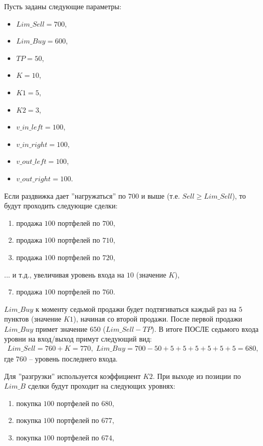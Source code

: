 
Пусть заданы следующие параметры:

\begin{itemize}
\item$Lim\_Sell= 700$,
\item$Lim\_Buy = 600$,
\item$TP = 50$,
\item$K  = 10$,
\item$K1 = 5$,
\item$K2 = 3$,
\item$v\_in\_left  = 100$,
\item$v\_in\_right  = 100$,
\item$v\_out\_left = 100$,
\item$v\_out\_right = 100$.
\end{itemize}

Если раздвижка дает ''нагружаться'' по $700$ и выше (т.е. $Sell \geq Lim\_Sell$), то будут проходить следующие сделки:
\begin{enumerate}
\item продажа $100$ портфелей по $700$,
\item продажа $100$ портфелей по $710$,
\item продажа $100$ портфелей по $720$,
\end{enumerate}

... и т.д., увеличивая уровень входа на $10$ (значение $K$),

\begin{enumerate}
\setcounter{enumi}{6}
\item продажа $100$ портфелей по $760$.
\end{enumerate}

\noindent $Lim\_Buy$ к моменту седьмой продажи будет подтягиваться каждый раз на $5$ пунктов (значение  $K1$), начиная  со второй продажи. После первой продажи $Lim\_Buy$
примет значение $650$ ($Lim\_Sell - TP$). В итоге ПОСЛЕ седьмого входа уровни на вход/выход примут следующий вид:
\begin{align*}
Lim\_Sell = 760 + K = 770, \;
Lim\_Buy = 700 - 50 + 5 + 5 + 5 + 5 + 5 + 5 = 680,
\end{align*}
где $760$ -- уровень последнего входа.


Для ''разгрузки'' используется коэффициент $K2$. При выходе из позиции по $Lim\_B$ сделки будут проходит на следующих уровнях:
\begin{enumerate}
\item покупка $100$ портфелей по $680$,
\item покупка $100$ портфелей по $677$,
\item покупка $100$ портфелей по $674$,
\end{enumerate}

